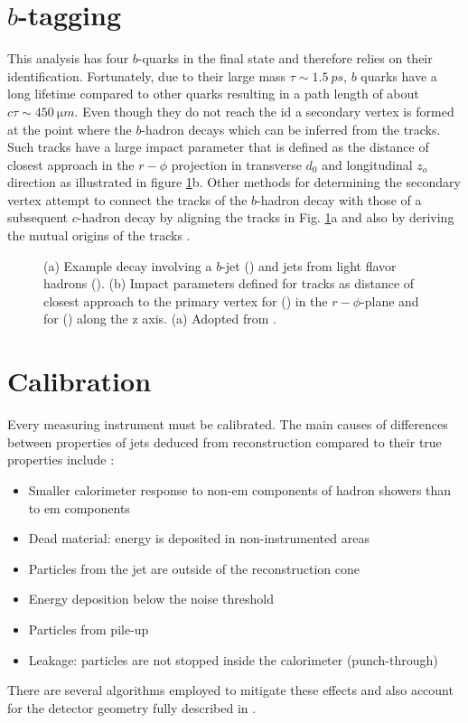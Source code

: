 \section{$b$-tagging}\label{sec:b_tagging}
This analysis has four $b$-quarks in the final state and therefore relies on their identification.  Fortunately, due to their large mass $\tau\sim\qty{1.5}{ps}$, $b$ quarks have a long lifetime compared to other quarks resulting in a path length of about $c\tau\sim\qty{450}{\micro m}$. Even though they do not reach the \ac{id} a secondary vertex is formed at the point where the $b$-hadron decays which can be inferred from the tracks. Such tracks have a large impact parameter that is defined as the distance of closest approach in the $r-\phi$ projection in transverse $d_0$ and longitudinal $z_o$ direction \citep{aad2008atlas} as illustrated in figure \ref{fig:secondary_vertex}b. Other methods for determining the secondary vertex attempt to connect the tracks of the $b$-hadron decay with those of a subsequent $c$-hadron decay by aligning the tracks in Fig. \ref{fig:secondary_vertex}a and also by deriving the mutual origins of the tracks \citep{ATL-PHYS-PUB-2017-013}. 

\begin{figure}[]
  \centering
  \caption{(a) Example decay involving a $b$-jet () and jets from light flavor hadrons (). (b) Impact parameters defined for tracks as distance of closest approach to the primary vertex for (\mbox{\color[HTML]{009245}{$d_0$}}) in the $r-\phi$-plane and for (\mbox{\color[HTML]{EC1C25}{$z_0$}}) along the z axis. (a) Adopted from \cite{Guth:2765038}.}
  \label{fig:secondary_vertex}
\end{figure} 

\section{Calibration}
Every measuring instrument must be calibrated. The main causes of differences between properties of jets deduced from reconstruction compared to their true properties include \citep{atlas2011jet}:
\begin{itemize}
  \item Smaller calorimeter response to non-\ac{em} components of hadron showers than to \ac{em} components
  \item Dead material: energy is deposited in non-instrumented areas
  \item Particles from the jet are outside of the reconstruction cone
  \item Energy deposition below the noise threshold
  \item Particles from pile-up 
  \item Leakage: particles are not stopped inside the calorimeter (punch-through)
\end{itemize}
There are several algorithms employed to mitigate these effects and also account for the detector geometry fully described in \citep{atlas2021jet}. 

